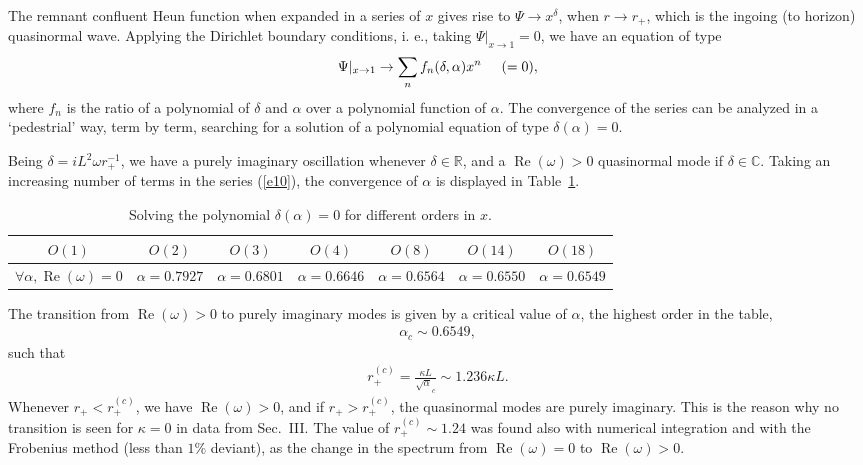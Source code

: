 \documentclass[preprint]{revtex4-1}
\renewcommand{\Re}{\operatorname{Re}}
\def\be{\begin{eqnarray}}
\def\ee{\end{eqnarray}}
\begin{document}
The remnant confluent Heun function when expanded in a series of $x$ gives rise to $\Psi \rightarrow x^{\delta}$, when $r\rightarrow r_+$, which is the ingoing (to horizon) quasinormal wave. Applying the Dirichlet boundary conditions, i. e., taking $\Psi|_{x\rightarrow 1} = 0$, we have an equation of type
\be
\label{e10}
\Psi|_{x\rightarrow 1} \rightarrow \sum_n f_n (\delta , \alpha ) x^n \hspace{0.5cm} (=0 ),
\ee
where $f_n$ is the ratio of a polynomial of $\delta$ and $\alpha$ over a polynomial function of $\alpha$. The convergence of the series can be analyzed in a ‘pedestrial’ way, term by term, searching for a solution of a polynomial equation of type $\delta (\alpha )=0$. 

Being $\delta = iL^2 \omega r_+^{-1}$, we have a purely imaginary oscillation whenever $\delta \in \mathbb{R}$, and a $\Re(\omega)>0$ quasinormal mode if $\delta \in \mathbb{C}$. 
Taking an increasing number of terms in the series (\ref{e10}), the convergence of $\alpha$ is displayed in Table~\ref{ordens_escalar}.


\begin{table}[htbp!]
\centering
\begin{tabular}{|c|c|c|c|c|c|c|}
\hline
  $ O(1)$ & $ O(2)$ & $ O(3)$ & $ O(4)$ & $ O(8)$ & $O(14)$ & $O(18)$ \\
\hline
$ \forall \alpha, \Re(\omega)=0$ & $\alpha = 0.7927$ & $\alpha = 0.6801$ & $\alpha = 0.6646$ & $\alpha = 0.6564$  & $\alpha = 0.6550$ & $\alpha = 0.6549$ \\
\hline
\end{tabular}
   \caption{Solving the polynomial $\delta (\alpha ) =0$ for different orders in $x$.}
   \label{ordens_escalar}
\end{table}
The transition from $\Re(\omega) >0$ to purely imaginary modes is given by a critical value of $\alpha$, the highest order in the table,
\be
\label{e12}
\alpha_c \sim 0.6549,
\ee
such that 
\be
\label{e13}
r_+^{(c)} = \frac{\kappa L}{\sqrt\alpha_c}\sim 1.236 \kappa L.
\ee
Whenever $r_+<r_+^{(c)}$, we have $\Re(\omega) >0$, and if $r_+>r_+^{(c)}$, the quasinormal modes are purely imaginary. This is the reason why no transition is seen for $\kappa = 0$ in data from Sec.~III. The value of $r_+^{(c)} \sim 1.24$ was found also with numerical integration and with the Frobenius method (less than $1\%$ deviant), as the change in the spectrum from $\Re(\omega)=0$ to $\Re(\omega)>0$.
\end{document}
